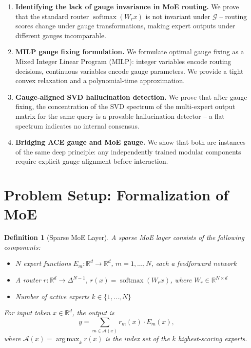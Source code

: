 \documentclass[12pt,a4paper]{article}
\newtheorem{definition}[theorem]{Definition}
\theoremstyle{remark}
\newcommand{\R}{\mathbb{R}}
\newcommand{\G}{\mathcal{G}}
\DeclareMathOperator{\argmax}{arg\,max}
\DeclareMathOperator{\softmax}{softmax}
\begin{document}
\begin{enumerate}[label=\textbf{(C\arabic*)}]
    \item \textbf{Identifying the lack of gauge invariance in MoE routing.} We prove that the standard router $\softmax(W_r x)$ is not invariant under $\G$ -- routing scores change under gauge transformations, making expert outputs under different gauges incomparable.
    \item \textbf{MILP gauge fixing formulation.} We formulate optimal gauge fixing as a Mixed Integer Linear Program (MILP): integer variables encode routing decisions, continuous variables encode gauge parameters. We provide a tight convex relaxation and a polynomial-time approximation.
    \item \textbf{Gauge-aligned SVD hallucination detection.} We prove that after gauge fixing, the concentration of the SVD spectrum of the multi-expert output matrix for the same query is a provable hallucination detector -- a flat spectrum indicates no internal consensus.
    \item \textbf{Bridging ACE gauge and MoE gauge.} We show that both are instances of the same deep principle: any independently trained modular components require explicit gauge alignment before interaction.
\end{enumerate}

\section{Problem Setup: Formalization of MoE}

\begin{definition}[Sparse MoE Layer]\label{def:moe}
A sparse MoE layer consists of the following components:
\begin{itemize}
    \item $N$ expert functions $E_m: \R^d \to \R^d$, $m = 1, \ldots, N$, each a feedforward network
    \item A router $r: \R^d \to \Delta^{N-1}$, $r(x) = \softmax(W_r x)$, where $W_r \in \R^{N \times d}$
    \item Number of active experts $k \in \{1, \ldots, N\}$
\end{itemize}
For input token $x \in \R^d$, the output is
\begin{equation}
    y = \sum_{m \in \mathcal{A}(x)} r_m(x) \cdot E_m(x),
\end{equation}
where $\mathcal{A}(x) = \argmax_k r(x)$ is the index set of the $k$ highest-scoring experts.
\end{definition}
\end{document}
